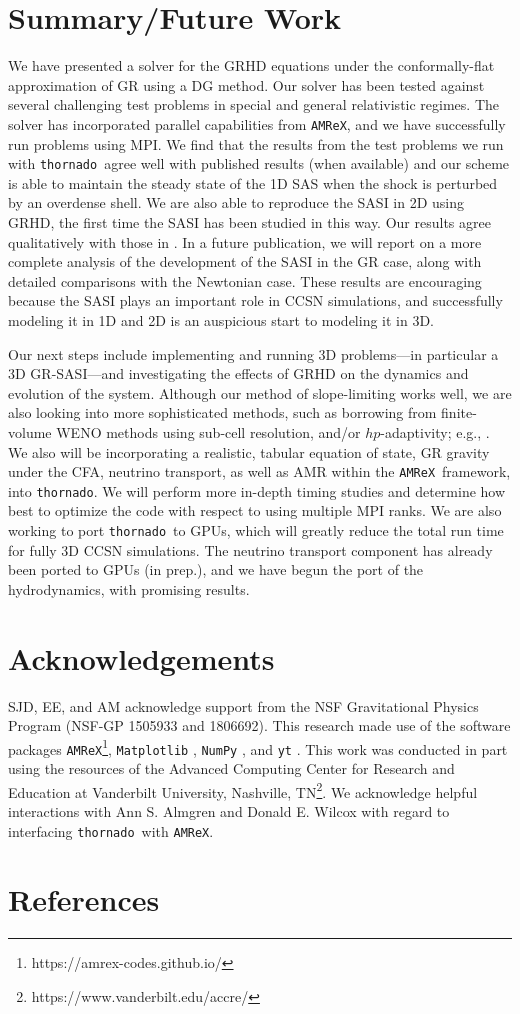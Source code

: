 \documentclass[letterpaper]{jpconf}
\newcommand{\thornado}{\texttt{thornado}}
\newcommand{\amrex}{\texttt{AMReX}}
\begin{document}
\section{Summary/Future Work}
We have presented a solver for the GRHD equations under the conformally-flat approximation of GR using a DG method. Our solver has been tested against several challenging test problems in special and general relativistic regimes. The solver has incorporated parallel capabilities from \amrex, and we have successfully run problems using MPI. We find that the results from the test problems we run with \thornado\ agree well with published results (when available) and our scheme is able to maintain the steady state of the 1D SAS when the shock is perturbed by an overdense shell. We are also able to reproduce the SASI in 2D using GRHD, the first time the SASI has been studied in this way. Our results agree qualitatively with those in \cite{Blondin2003}. In a future publication, we will report on a more complete analysis of the development of the SASI in the GR case, along with detailed comparisons with the Newtonian case. These results are encouraging because the SASI plays an important role in CCSN simulations, and successfully modeling it in 1D and 2D is an auspicious start to modeling it in 3D.

Our next steps include implementing and running 3D problems---in particular a 3D GR-SASI---and investigating the effects of GRHD on the dynamics and evolution of the system. Although our method of slope-limiting works well, we are also looking into more sophisticated methods, such as borrowing from finite-volume WENO methods using sub-cell resolution, and/or $hp$-adaptivity; e.g., \cite{Dumbser2014,Fambri2018}. We also will be incorporating a realistic, tabular equation of state, GR gravity under the CFA, neutrino transport, as well as AMR within the \amrex\ framework, into \thornado. We will perform more in-depth timing studies and determine how best to optimize the code with respect to using multiple MPI ranks. We are also working to port \thornado\ to GPUs, which will greatly reduce the total run time for fully 3D CCSN simulations. The neutrino transport component has already been ported to GPUs \cite{Laiu2019} (in prep.), and we have begun the port of the hydrodynamics, with promising results.

\section*{Acknowledgements}
SJD, EE, and AM acknowledge support from the NSF Gravitational Physics Program (NSF-GP 1505933 and 1806692). This research made use of the software packages \texttt{AMReX}\footnote{https://amrex-codes.github.io/}, \texttt{Matplotlib} \cite{Hunter2007}, \texttt{NumPy} \cite{OliphantNumPy}, and \texttt{yt} \cite{Turk2011yt}. This work was conducted in part using the resources of the Advanced Computing Center for Research and Education at Vanderbilt University, Nashville, TN\footnote{https://www.vanderbilt.edu/accre/}. We acknowledge helpful interactions with Ann S. Almgren and Donald E. Wilcox with regard to interfacing \thornado\ with \amrex.

\section*{References}

\end{document}
